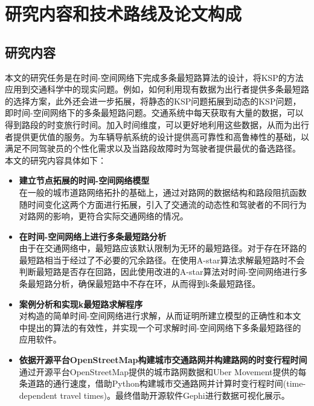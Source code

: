 \section{研究内容和技术路线及论文构成}\label{sec:研究内容和技术路线及论文构成}

\subsection{研究内容}\label{subsec:研究内容}
本文的研究任务是在时间-空间网络下完成多条最短路算法的设计，将KSP的方法应用到交通科学中的现实问题。例如，如何利用现有数据为出行者提供多条最短路的选择方案，此外还会进一步拓展，将静态的KSP问题拓展到动态的KSP问题，即时间-空间网络下的多条最短路问题。交通系统中每天获取有大量的数据，可以得到路段的时变旅行时间。加入时间维度，可以更好地利用这些数据，从而为出行者提供更优值的服务。为车辆导航系统的设计提供高可靠性和高鲁棒性的基础，以满足不同驾驶员的个性化需求以及当路段故障时为驾驶者提供最优的备选路径。
本文的研究内容具体如下：
\begin{itemize}%
    \item \textbf{建立节点拓展的时间-空间网络模型}\\
    在一般的城市道路网络拓扑的基础上，通过对路网的数据结构和路段阻抗函数随时间变化这两个方面进行拓展，引入了交通流的动态性和驾驶者的不同行为对路网的影响，更符合实际交通网络的情况。

    \item \textbf{在时间-空间网络上进行多条最短路分析}\\
    由于在交通网络中，最短路应该默认限制为无环的最短路径。对于存在环路的最短路相当于经过了不必要的冗余路径。在使用A-star算法求解最短路时不会判断最短路是否存在回路，因此使用改进的A-star算法对时间-空间网络进行多条最短路分析，确保最短路中不存在环，从而得到k条最短路径。

    \item \textbf{案例分析和实现k最短路求解程序}\\
    对构造的简单时间-空间网络进行求解，从而证明所建立模型的正确性和本文中提出的算法的有效性，并实现一个可求解时间-空间网络下多条最短路径的应用软件。

    \item \textbf{依据开源平台OpenStreetMap构建城市交通路网并构建路网的时变行程时间}\\
    通过开源平台OpenStreetMap提供的城市路网数据和Uber Movement提供的每条道路的通行速度，借助Python构建城市交通路网并计算时变行程时间(time-dependent travel times)。最终借助开源软件Gephi进行数据可视化展示。
\end{itemize}

